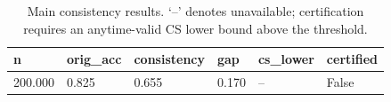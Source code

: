 \begin{table}[t]
\centering
\begin{tabular}{llllll}
\toprule
n & orig_acc & consistency & gap & cs_lower & certified \\
\midrule
200.000 & 0.825 & 0.655 & 0.170 & -- & False \\
\bottomrule
\end{tabular}
\caption{Main consistency results. `--' denotes unavailable; certification requires an anytime-valid CS lower bound above the threshold.}
\end{table}
